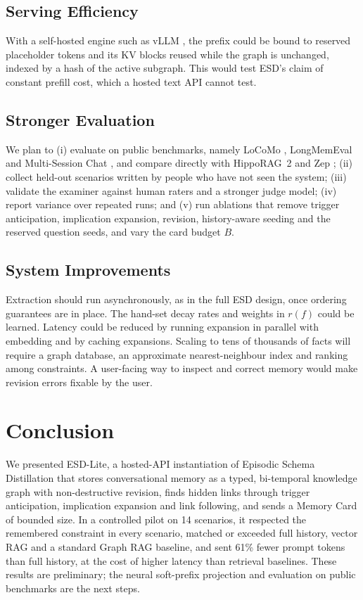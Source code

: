 \documentclass[conference]{IEEEtran}
\begin{document}
\subsection{Serving Efficiency}
With a self-hosted engine such as vLLM \cite{b_vllm}, the prefix could be bound to reserved placeholder tokens and its KV blocks reused while the graph is unchanged, indexed by a hash of the active subgraph. This would test ESD's claim of constant prefill cost, which a hosted text API cannot test.

\subsection{Stronger Evaluation}
We plan to (i) evaluate on public benchmarks, namely LoCoMo \cite{b_locomo}, LongMemEval \cite{b_longmemeval} and Multi-Session Chat \cite{b_msc}, and compare directly with HippoRAG~2 \cite{b_hipporag2} and Zep \cite{b_zep}; (ii) collect held-out scenarios written by people who have not seen the system; (iii) validate the examiner against human raters and a stronger judge model; (iv) report variance over repeated runs; and (v) run ablations that remove trigger anticipation, implication expansion, revision, history-aware seeding and the reserved question seeds, and vary the card budget $B$.

\subsection{System Improvements}
Extraction should run asynchronously, as in the full ESD design, once ordering guarantees are in place. The hand-set decay rates and weights in $r(f)$ could be learned. Latency could be reduced by running expansion in parallel with embedding and by caching expansions. Scaling to tens of thousands of facts will require a graph database, an approximate nearest-neighbour index and ranking among constraints. A user-facing way to inspect and correct memory would make revision errors fixable by the user.

\section{Conclusion}
We presented ESD-Lite, a hosted-API instantiation of Episodic Schema Distillation that stores conversational memory as a typed, bi-temporal knowledge graph with non-destructive revision, finds hidden links through trigger anticipation, implication expansion and link following, and sends a Memory Card of bounded size. In a controlled pilot on 14 scenarios, it respected the remembered constraint in every scenario, matched or exceeded full history, vector RAG and a standard Graph RAG baseline, and sent 61\% fewer prompt tokens than full history, at the cost of higher latency than retrieval baselines. These results are preliminary; the neural soft-prefix projection and evaluation on public benchmarks are the next steps.
\end{document}
